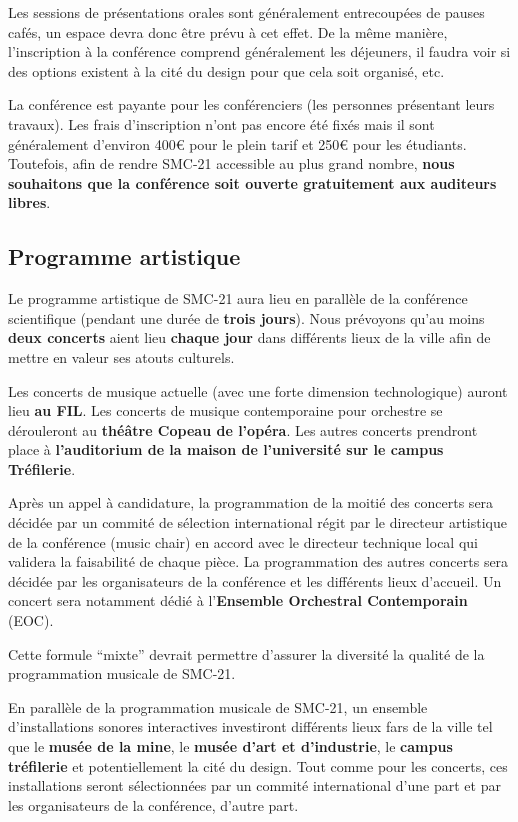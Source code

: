\documentclass[fontsize=12pt]{scrartcl} %
\numberwithin{equation}{section} %
\numberwithin{figure}{section} %
\numberwithin{table}{section} %
\begin{document}
Les sessions de présentations orales sont généralement entrecoupées de pauses cafés, un espace devra donc être prévu à cet effet. De la même manière, l'inscription à la conférence comprend généralement les déjeuners, il faudra voir si des options existent à la cité du design pour que cela soit organisé, etc.

La conférence est payante pour les conférenciers (les personnes présentant leurs travaux). Les frais d'inscription n'ont pas encore été fixés mais il sont généralement d'environ 400\euro{} pour le plein tarif et 250\euro{} pour les étudiants. Toutefois, afin de rendre SMC-21 accessible au plus grand nombre, \textbf{nous souhaitons que la conférence soit ouverte gratuitement aux auditeurs libres}. 

\subsection{Programme artistique}

Le programme artistique de SMC-21 aura lieu en parallèle de la conférence scientifique (pendant une durée de \textbf{trois jours}). Nous prévoyons qu'au moins \textbf{deux concerts} aient lieu \textbf{chaque jour} dans différents lieux de la ville afin de mettre en valeur ses atouts culturels. 

Les concerts de musique actuelle (avec une forte dimension technologique) auront lieu \textbf{au FIL}. Les concerts de musique contemporaine pour orchestre se dérouleront au \textbf{théâtre Copeau de l'opéra}. Les autres concerts prendront place à \textbf{l'auditorium de la maison de l'université sur le campus Tréfilerie}.

Après un appel à candidature, la programmation de la moitié des concerts sera décidée par un commité de sélection international régit par le directeur artistique de la conférence (music chair) en accord avec le directeur technique local qui validera la faisabilité de chaque pièce. La programmation des autres concerts sera décidée par les organisateurs de la conférence et les différents lieux d'accueil. Un concert sera notamment dédié à l'\textbf{Ensemble Orchestral Contemporain} (EOC). 

Cette formule ``mixte'' devrait permettre d'assurer la diversité la qualité de la programmation musicale de SMC-21.

En parallèle de la programmation musicale de SMC-21, un ensemble d'installations sonores interactives investiront différents lieux fars de la ville tel que le \textbf{musée de la mine}, le \textbf{musée d'art et d'industrie}, le \textbf{campus tréfilerie} et potentiellement la cité du design. Tout comme pour les concerts, ces installations seront sélectionnées par un commité international d'une part et par les organisateurs de la conférence, d'autre part.
\end{document}
